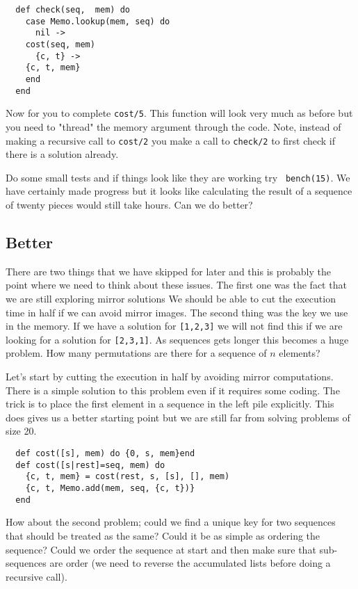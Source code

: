 \documentclass[a4paper,11pt]{article}
\begin{document}
\begin{verbatim}
  def check(seq,  mem) do
    case Memo.lookup(mem, seq) do
      nil ->
	cost(seq, mem)
      {c, t} ->
	{c, t, mem}
    end
  end
\end{verbatim}

Now for you to complete {\tt cost/5}. This function will look very
much as before but you need to "thread" the memory argument through
the code. Note, instead of making a recursive call to {\tt cost/2} you
make a call to {\tt check/2} to first check if there is a solution
already.

Do some small tests and if things look like they are working try {\tt
  bench(15)}. We have certainly made progress but it looks like
calculating the result of a sequence of twenty pieces would still take
hours. Can we do better?

\subsection*{Better}

There are two things that we have skipped for later and this is
probably the point where we need to think about these issues. The
first one was the fact that we are still exploring mirror solutions We
should be able to cut the execution time in half if we can avoid
mirror images. The second thing was the key we use in the memory. If
we have a solution for {\tt [1,2,3]} we will not find this if we are
looking for a solution for {\tt [2,3,1]}. As sequences gets longer
this becomes a huge problem. How many permutations are there for a
sequence of $n$ elements?

Let's start by cutting the execution in half by avoiding mirror
computations. There is a simple solution to this problem even if it
requires some coding. The trick is to place the first element in a
sequence in the left pile explicitly. This does gives us a better
starting point but we are still far from solving problems of size 20.

\begin{verbatim}
  def cost([s], mem) do {0, s, mem}end
  def cost([s|rest]=seq, mem) do
    {c, t, mem} = cost(rest, s, [s], [], mem)
    {c, t, Memo.add(mem, seq, {c, t})}
  end  
\end{verbatim}

How about the second problem; could we find a unique key for two
sequences that should be treated as the same? Could it be as simple as
ordering the sequence? Could we order the sequence at start and then
make sure that sub-sequences are order (we need to reverse the
accumulated lists before doing a recursive call).
\end{document}
